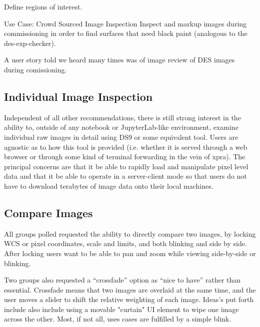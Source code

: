 Define regions of interest.

Use Case: Crowd Sourced Image Inspection
Inspect and markup images during commissioning in order to find surfaces that need black paint (analogous to the des-exp-checker).

A user story told we heard many times was of image review of DES images during comissioning.


\subsection{Individual Image Inspection}
\label{sec:ds9}
Independent of all other recommendations, there is still strong interest in the
ability to, outside of any notebook or JupyterLab-like environment, examine
individual raw images in detail using DS9 or some equivalent tool.  Users are
agnostic as to how this tool is provided (i.e. whether it is served through a
web browser or through some kind of terminal forwarding in the vein of xpra).
The principal concerns are that it be able to rapidly load and manipulate pixel
level data and that it be able to operate in a server-client mode so that users
do not have to download terabytes of image data onto their local machines.

\subsection{Compare Images}

All groups polled requested the ability to directly compare two images, by locking WCS or pixel coordinates, scale and limits, and both blinking and side by side.
After locking users want to be able to pan and zoom while viewing side-by-side or blinking.

Two groups also requested a ``crossfade'' option as ``nice to have'' rather than essential.
Crossfade means that two images are overlaid at the same time, and the user moves a slider to shift the relative weighting of each image.
Ideas's put forth include also include using a movable "curtain" UI element to wipe one image across the other.
Most, if not all, uses cases are fulfilled by a simple blink.

